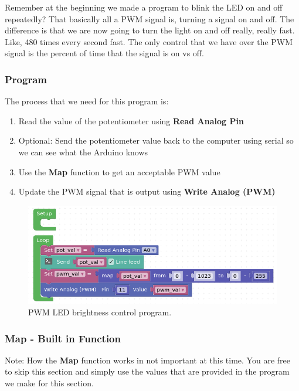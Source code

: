 \documentclass[12pt]{article}
\begin{document}
	Remember at the beginning we made a program to blink the LED on and off repeatedly? That basically all a PWM signal is, turning a signal on and off. The difference is that we are now going to turn the light on and off really, really fast. Like, 480 times every second fast. The only control that we have over the PWM signal is the percent of time that the signal is on vs off.
	
	\subsubsection{Program}
	
	The process that we need for this program is:
	
	\begin{enumerate}
		\itemsep -1em
		\item Read the value of the potentiometer using \textbf{Read Analog Pin}
		\item Optional: Send the potentiometer value back to the computer using serial so we can see what the Arduino knows
		\item Use the \textbf{Map} function to get an acceptable PWM value
		\item Update the PWM signal that is output using \textbf{Write Analog (PWM)}
	\end{enumerate}

	
	\begin{figure}[H]
		\begin{center}
			\includegraphics[scale=0.7]{p_pwm_led_ctrl}
			\caption{PWM LED brightness control program.}
			\label{prog:pwm_led_ctrl}
		\end{center}
	\end{figure}


	\subsubsection{Map - Built in Function}
	
	Note: How the \textbf{Map} function works in not important at this time. You are free to skip this section and simply use the values that are provided in the program we make for this section.
	
\end{document}
